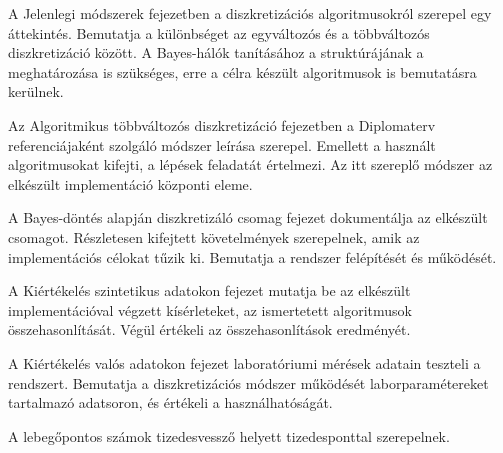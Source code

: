 A Jelenlegi módszerek fejezetben a diszkretizációs algoritmusokról szerepel egy áttekintés. Bemutatja a különbséget az egyváltozós és a többváltozós diszkretizáció között. A Bayes-hálók tanításához a struktúrájának a meghatározása is szükséges, erre a célra készült algoritmusok is bemutatásra kerülnek.

Az Algoritmikus többváltozós diszkretizáció fejezetben a Diplomaterv referenciájaként szolgáló módszer leírása szerepel. Emellett a használt algoritmusokat kifejti, a lépések feladatát értelmezi. Az itt szereplő módszer az elkészült implementáció központi eleme.

A Bayes-döntés alapján diszkretizáló csomag fejezet dokumentálja az elkészült csomagot. Részletesen kifejtett követelmények szerepelnek, amik az implementációs célokat tűzik ki. Bemutatja a rendszer felépítését és működését.

A Kiértékelés szintetikus adatokon fejezet mutatja be az elkészült implementációval végzett kísérleteket, az ismertetett algoritmusok összehasonlítását. Végül értékeli az összehasonlítások eredményét.

A Kiértékelés valós adatokon fejezet laboratóriumi mérések adatain teszteli a rendszert. Bemutatja a diszkretizációs módszer működését laborparamétereket tartalmazó adatsoron, és értékeli a használhatóságát.

A lebegőpontos számok tizedesvessző helyett tizedesponttal szerepelnek.